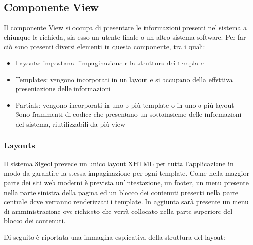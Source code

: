 \documentclass[11pt,a4paper]{article}
\begin{document}
\subsection{Componente View}
Il componente View si occupa di presentare le informazioni presenti nel sistema a chiunque le richieda, sia esso un utente finale o un altro sistema software. Per far ciò sono presenti diversi elementi in questa componente, tra i quali:
\begin{itemize}
 \item Layouts: impostano l'impaginazione e la struttura dei template.
 \item Templates: vengono incorporati in un layout e si occupano della effettiva presentazione delle informazioni
 \item Partials: vengono incorporati in uno o più template o in uno o più layout. Sono frammenti di codice che presentano un sottoinsieme delle informazioni del sistema, riutilizzabili da più view.
\end{itemize}
\subsubsection{Layouts}
Il sistema Sigeol prevede un unico layout XHTML per tutta l'applicazione in modo da garantire la stessa impaginazione per ogni template. Come nella maggior parte dei siti web moderni è prevista un'intestazione, un \underline{footer}, un menu presente nella parte sinistra della pagina ed un blocco dei contenuti presenti nella parte centrale dove verranno renderizzati i template. In aggiunta sarà presente un menu di amministrazione ove richiesto che verrà collocato nella parte superiore del blocco dei contenuti.

Di seguito è riportata una immagina esplicativa della struttura del layout:
\end{document}
